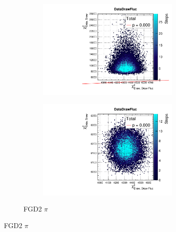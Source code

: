 \begin{figure}[h]
\begin{subfigure}[t]{\textwidth}
\begin{subfigure}[t]{0.24\textwidth}
			\includegraphics[width=\textwidth, trim={0mm 0mm 0mm 8mm}, clip,page=92]{figures/mach3/2018/data/2018a_FixedCov_RedCov_Mpi_Data_merge_PriorPred_procs}
		\end{subfigure}
		\begin{subfigure}[t]{0.24\textwidth}
			\includegraphics[width=\textwidth, trim={0mm 0mm 0mm 8mm}, clip,page=92]{figures/mach3/2018/data/2018a_FixedCov_RedCov_Mpi_Data_merge_PostPredStore_FullLLH_procs}
		\end{subfigure}
		\caption{FGD2 $\pi$}
	\end{subfigure}
	

\end{figure}
